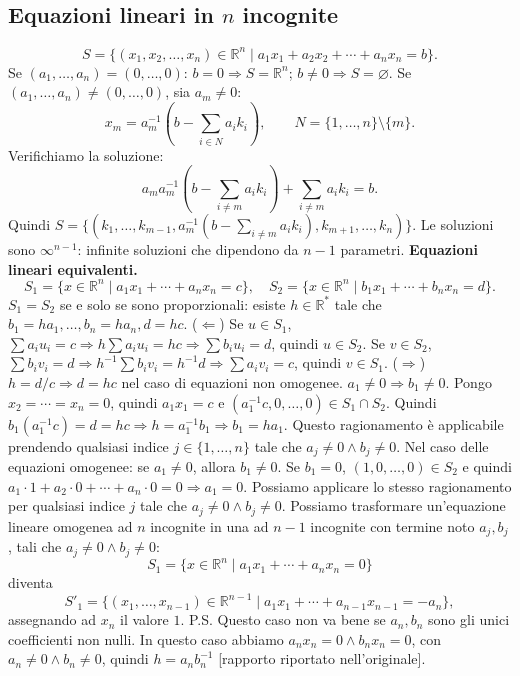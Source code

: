 \documentclass[11pt,a4paper]{article}
\newcommand{\pagina}[1]{\clearpage}
\begin{document}
\subsection*{Equazioni lineari in $n$ incognite}
\[S=\{(x_1,x_2,\ldots,x_n)\in\mathbb R^n\mid a_1x_1+a_2x_2+\cdots+a_nx_n=b\}.\]
Se $(a_1,\ldots,a_n)=(0,\ldots,0)$: $b=0\Longrightarrow S=\mathbb R^n$; $b\ne0\Longrightarrow S=\varnothing$.
Se $(a_1,\ldots,a_n)\ne(0,\ldots,0)$, sia $a_m\ne0$:
\[x_m=a_m^{-1}\left(b-\sum_{i\in N}a_ik_i\right),\qquad N=\{1,\ldots,n\}\setminus\{m\}.\]
Verifichiamo la soluzione:
\[a_ma_m^{-1}\left(b-\sum_{i\ne m}a_ik_i\right)+\sum_{i\ne m}a_ik_i=b.\]
Quindi $S=\{(k_1,\ldots,k_{m-1},a_m^{-1}(b-\sum_{i\ne m}a_ik_i),k_{m+1},\ldots,k_n)\}$.
Le soluzioni sono $\infty^{n-1}$: infinite soluzioni che dipendono da $n-1$ parametri.
\pagina{21}
\textbf{Equazioni lineari equivalenti.}
\[S_1=\{x\in\mathbb R^n\mid a_1x_1+\cdots+a_nx_n=c\},\quad S_2=\{x\in\mathbb R^n\mid b_1x_1+\cdots+b_nx_n=d\}.\]
$S_1=S_2$ se e solo se sono proporzionali: esiste $h\in\mathbb R^*$ tale che $b_1=ha_1,\ldots,b_n=ha_n,d=hc$.
($\Leftarrow$) Se $u\in S_1$, $\sum a_iu_i=c\Longrightarrow h\sum a_iu_i=hc\Longrightarrow\sum b_iu_i=d$, quindi $u\in S_2$. Se $v\in S_2$, $\sum b_iv_i=d\Longrightarrow h^{-1}\sum b_iv_i=h^{-1}d\Longrightarrow\sum a_iv_i=c$, quindi $v\in S_1$.
($\Rightarrow$) $h=d/c\Longrightarrow d=hc$ nel caso di equazioni non omogenee. $a_1\ne0\Longrightarrow b_1\ne0$. Pongo $x_2=\cdots=x_n=0$, quindi $a_1x_1=c$ e $(a_1^{-1}c,0,\ldots,0)\in S_1\cap S_2$. Quindi $b_1(a_1^{-1}c)=d=hc\Longrightarrow h=a_1^{-1}b_1\Longrightarrow b_1=ha_1$. Questo ragionamento è applicabile prendendo
\pagina{22}
qualsiasi indice $j\in\{1,\ldots,n\}$ tale che $a_j\ne0\wedge b_j\ne0$.
Nel caso delle equazioni omogenee: se $a_1\ne0$, allora $b_1\ne0$. Se $b_1=0$, $(1,0,\ldots,0)\in S_2$ e quindi $a_1\cdot1+a_2\cdot0+\cdots+a_n\cdot0=0\Longrightarrow a_1=0$. Possiamo applicare lo stesso ragionamento per qualsiasi indice $j$ tale che $a_j\ne0\wedge b_j\ne0$.
Possiamo trasformare un'equazione lineare omogenea ad $n$ incognite in una ad $n-1$ incognite con termine noto $a_j,b_j$, tali che $a_j\ne0\wedge b_j\ne0$:
\[S_1=\{x\in\mathbb R^n\mid a_1x_1+\cdots+a_nx_n=0\}\]
diventa
\[S'_1=\{(x_1,\ldots,x_{n-1})\in\mathbb R^{n-1}\mid a_1x_1+\cdots+a_{n-1}x_{n-1}=-a_n\},\]
assegnando ad $x_n$ il valore $1$. P.S. Questo caso non va bene se $a_n,b_n$ sono gli unici coefficienti non nulli. In questo caso abbiamo $a_nx_n=0\wedge b_nx_n=0$, con $a_n\ne0\wedge b_n\ne0$, quindi $h=a_nb_n^{-1}$ [rapporto riportato nell'originale].
\end{document}
